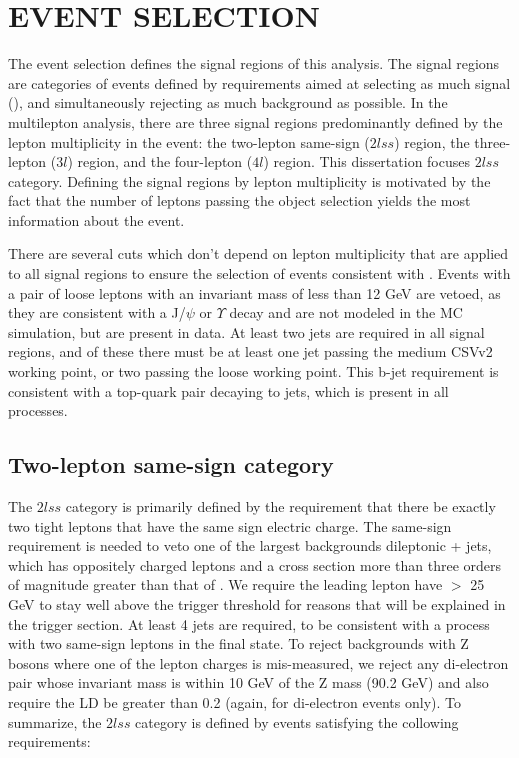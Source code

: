 %
%

\chapter{EVENT SELECTION}
\label{chap:event_selection}
The event selection defines the signal regions of this analysis. The signal regions are categories of events defined by requirements aimed at 
selecting as much signal (\tth), and simultaneously rejecting as much background as possible.
In the multilepton analysis, there are three signal regions predominantly defined by the lepton multiplicity in the event: the two-lepton same-sign ($2lss$) region,
the three-lepton ($3l$) region, and the four-lepton ($4l$) region. This dissertation focuses $2lss$ category. Defining the signal regions by lepton multiplicity is motivated
by the fact that the number of leptons passing the object selection yields the most information about the event.

There are several cuts which don't depend on lepton multiplicity that are applied to all signal regions to ensure the selection of events consistent with \tth. Events with
a pair of loose leptons with an invariant mass of less than 12 GeV are vetoed, as they are consistent with a J/$\psi$ or $\Upsilon$ decay and are not modeled in the MC
simulation, but are present in data. At least two jets are required in all signal regions, and of these there must be at least one jet passing the medium CSVv2 working point,
or two passing the loose working point. This b-jet requirement is consistent with a top-quark pair decaying to jets, which is present in all \tth processes. 

\section{Two-lepton same-sign category}
The $2lss$ category is primarily defined by the requirement that there be exactly two tight leptons that have the same sign electric charge. The same-sign requirement is needed to veto 
one of the largest backgrounds dileptonic \ttbar + jets, which has oppositely charged leptons and a cross section more than three orders of magnitude greater than that of \tth. We require
the leading lepton have \pt $>$ 25 GeV to stay well above the trigger threshold for reasons that will be explained in the trigger section. At least 4 jets are required, to be consistent with
a \tth process with two same-sign leptons in the final state. To reject backgrounds with Z bosons where one of the lepton charges is mis-measured, we reject any di-electron pair whose invariant
mass is within 10 GeV of the Z mass (90.2 GeV) and also require the \met LD be greater than 0.2 (again, for di-electron events only). To summarize, the $2lss$ category is defined by events
satisfying the collowing requirements:

